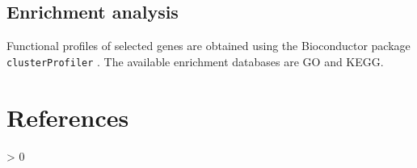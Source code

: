 \documentclass[
]{book}
\newlength{\cslhangindent}
\newenvironment{CSLReferences}[2] %
 {%
  \setlength{\parindent}{0pt}
  \ifodd #1 \everypar{\setlength{\hangindent}{\cslhangindent}}\ignorespaces\fi
  \ifnum #2 > 0
  \setlength{\parskip}{#2\baselineskip}
  \fi
 }%
 {}
\begin{document}
\hypertarget{enrichment-analysis-1}{%
\section{Enrichment analysis}\label{enrichment-analysis-1}}

Functional profiles of selected genes are obtained using the Bioconductor package \texttt{clusterProfiler} \citet{clusterprofiler} . The available enrichment databases are GO and KEGG.

\hypertarget{references}{%
\chapter{References}\label{references}}

\hypertarget{refs}{}
\begin{CSLReferences}{0}{0}
\end{CSLReferences}

  
\end{document}
